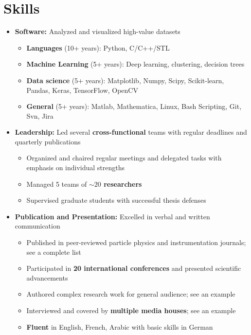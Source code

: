 \documentclass{myfancycv}
\begin{document}
\section{Skills}
\begin{itemize}

\item {\textbf{Software:} Analyzed and visualized high-value datasets
{\begin{itemize}\setlength\itemindent{-2.2em}
\item {\bf Languages} (10+ years): Python, C/C++/STL
\item {\bf Machine Learning} (5+ years): Deep learning, clustering, decision trees
\item {\bf Data science} (5+ years): Matplotlib, Numpy, Scipy, Scikit-learn, Pandas, Keras, TensorFlow, OpenCV
\item {\bf General} (5+ years): Matlab, Mathematica, Linux, Bash Scripting, Git, Svn, Jira
\end{itemize}
}
}

\vspace{6pt}

\item {\textbf{Leadership:} Led several {\bf cross-functional} teams with regular deadlines and quarterly publications
{\begin{itemize}\setlength\itemindent{-2.2em}
    \item Organized and chaired regular meetings and delegated tasks with emphasis on individual strengths
    \item Managed 5 teams of {\bf $\sim20$ researchers}
    \item Supervised graduate students with successful thesis defenses
\end{itemize}}%
}

\vspace{6pt}

\item{ \textbf{Publication and Presentation:} Excelled in verbal and written communication
{\begin{itemize}\setlength\itemindent{-2.2em}
\item Published in peer-reviewed particle physics and instrumentation journals; see a complete list \href{https://orcid.org/0000-0002-9169-0793}{}
\item Participated in {\bf 20 international conferences} and presented scientific advancements
\item Authored complex research work for general audience; see an example \href{http://atlas.cern/updates/physics-briefing/probing-dark-matter-higgs-boson}{}
  \item Interviewed and covered by {\bf multiple media houses}; see an example \href{https://www.symmetrymagazine.org/article/the-invisible-higgs-bosons}{}

\item {\bf Fluent} in English, French, Arabic with basic skills in German

\end{itemize}}%
}


\end{itemize}
\end{document}

